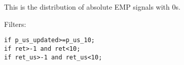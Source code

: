 





\thispagestyle{fancy}

\newcommand{\code}{\texttt}
\newcommand*{\Commonpath}{20190107}

This is the distribution of absolute EMP signals with 0s.

Filters:

\code{if p\_us\_updated>=p\_us\_10;} \\
\code{if ret>-1 and ret<10;} \\
\code{if ret\_us>-1 and ret\_us<10;} \\





